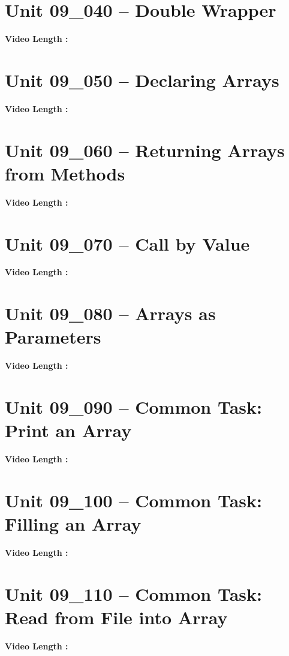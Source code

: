 \documentclass[letterpaper,12pt]{exam}
\newcommand{\unit}{Unit 09}
\begin{document}
\begin{questions}
\section*{\unit\_040 -- Double Wrapper } 
\par{\selectfont\textbf{Video Length :}}

\section*{\unit\_050 -- Declaring Arrays} 
\par{\selectfont\textbf{Video Length :}}

\section*{\unit\_060 -- Returning Arrays from Methods} 
\par{\selectfont\textbf{Video Length :}}

\section*{\unit\_070 -- Call by Value } 
\par{\selectfont\textbf{Video Length :}}

\section*{\unit\_080 -- Arrays as Parameters} 
\par{\selectfont\textbf{Video Length :}}

\section*{\unit\_090 -- Common Task: Print an Array} 
\par{\selectfont\textbf{Video Length :}}

\section*{\unit\_100 -- Common Task: Filling an Array} 
\par{\selectfont\textbf{Video Length :}}
\section*{\unit\_110 -- Common Task: Read from File into Array} 
\par{\selectfont\textbf{Video Length :}}

\end{questions}
\end{document}
